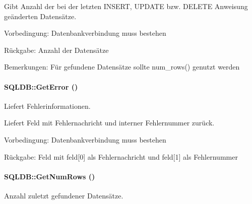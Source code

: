 Gibt Anzahl der bei der letzten INSERT, UPDATE bzw. DELETE Anweisung geänderten Datensätze. \begin{Desc}
\item[Vorbedingung:]Datenbankverbindung muss bestehen \end{Desc}
\begin{Desc}
\item[R\"{u}ckgabe:]Anzahl der Datensätze \end{Desc}
\begin{Desc}
\item[Bemerkungen:]Für gefundene Datensätze sollte num\_\-rows() genutzt werden \end{Desc}
\hypertarget{classSQLDB_efc9afe11649d6cdae21575717ec3436}{
\paragraph[GetError]{\setlength{\rightskip}{0pt plus 5cm}SQLDB::Get\-Error ()}\hfill}
\label{classSQLDB_efc9afe11649d6cdae21575717ec3436}


Liefert Fehlerinformationen. 

Liefert Feld mit Fehlernachricht und interner Fehlernummer zurück. \begin{Desc}
\item[Vorbedingung:]Datenbankverbindung muss bestehen \end{Desc}
\begin{Desc}
\item[R\"{u}ckgabe:]Feld mit feld\mbox{[}0\mbox{]} als Fehlernachricht und feld\mbox{[}1\mbox{]} als Fehlernummer \end{Desc}
\hypertarget{classSQLDB_15b181251b309ab55331be29fa33ac9f}{
\paragraph[GetNumRows]{\setlength{\rightskip}{0pt plus 5cm}SQLDB::Get\-Num\-Rows ()}\hfill}
\label{classSQLDB_15b181251b309ab55331be29fa33ac9f}


Anzahl zuletzt gefundener Datensätze. 

